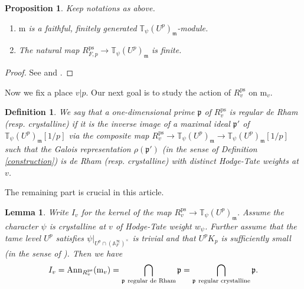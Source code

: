 \documentclass[a4paper, 12pt]{amsart}
\newtheorem{lem}[thm]{Lemma}
\newtheorem{prop}[thm]{Proposition}
\newtheorem{defn}[thm]{Definition} \theoremstyle{remark}
\def\ps{\mathrm{ps}}
\newcommand{\T}{\mathbb{T}}
\newcommand{\A}{\mathbb{A}}
\newcommand{\kp}{\mathfrak{p}}
\newcommand{\km}{\mathfrak{m}}
\newcommand{\mm}{\mathrm{m}}
\begin{document}
       \begin{prop}\label{finiteness from lgc}
       	Keep notations as above.
       	\begin{enumerate}
       	\item  $\mm$ is a faithful, finitely generated $\T_\psi(U^p)_\km$-module. 
       	\item  The natural map $ R_{F,p}^\ps \to \T_{\psi}(U^p)_\km$ is finite.
       \end{enumerate}
       	
       \end{prop}
  
  \begin{proof}
  	See \cite[Corollary 3.5.8]{pan2022fontaine} and \cite[Corollary 3.3.7]{Zhang:2024aa}.
  \end{proof}
  
    Now we fix a place $v|p$. Our next goal is to study the action of $ R_v^\ps$ on $\mm_v$. 
    
    \begin{defn}\label{r dR}
    	We say that a one-dimensional prime $\kp$ of $ R_v^\ps$ is \textit{regular de Rham} (resp. \textit{crystalline}) if it is the inverse image of a maximal ideal $\kp'$ of $\T_{\psi}(U^p)_\km[1/p] $ via the composite map $R_v^\ps \to \T_{\psi}(U^p)_\km \to  \T_{\psi}(U^p)_\km[1/p]$ such that the Galois representation $\rho(\kp')$ (in the sense of Definition \ref{construction}) is de Rham (resp. crystalline) with distinct Hodge-Tate weights at $v$.
    \end{defn}
    
    The remaining part is crucial in this article.
    
    \begin{lem}\label{intersection}
    	Write $I_v$ for the kernel of the map $ R_v^\ps \to \T_{\psi}(U^p)_\km$. Assume the character $\psi$ is crystalline at $v$ of Hodge-Tate weight $w_\psi$. Further assume that the tame level $U^p$ satisfies  $\psi|_{U^p\cap(\A_F^\infty)^\times}$ is trivial and that $U^pK_p$ is sufficiently small (in the sense of \cite[page 1046]{pan2022fontaine}). Then we have $$
    	I_v = \operatorname{Ann}_{R_v^\ps}(\mm_v) = \bigcap_{\kp~\textnormal{regular de Rham}} \kp = \bigcap_{\kp~\textnormal{regular crystalline}} \kp .$$
    	
    \end{lem}
    
\end{document}
